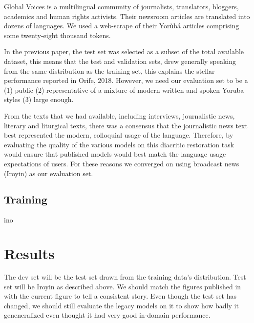 \documentclass{article} %
\begin{document}
Global Voices is a multilingual community of journalists, translators, bloggers, academics and human rights activists. Their newsroom articles are translated into dozens of languages. We used a web-scrape of their Yor{\`u}b{\'a} articles comprising some twenty-eight thousand tokens.

In the previous paper, the test set was selected as a subset of the total available dataset, this means that the test and validation sets, drew generally speaking from the same distribution as the training set, this explains the stellar performance reported in Orife, 2018. However, we need our evaluation set to be a (1) public (2) representative of a mixture of modern written and spoken Yoruba styles (3) large enough. 

From the texts that we had available, including interviews, journalistic news, literary and liturgical texts, there was a consensus that the journalistic news text best represented the modern, colloquial usage of the language. Therefore, by evaluating the quality of the various models on this diacritic restoration task would ensure that published models would best match the language usage expectations of users. For these reasons we converged on using broadcast news (Iroyin) as our evaluation set.


\subsection{Training}\label{sec:training}
ino

\section{Results}\label{sec:results}


The dev set will be the test set drawn from the training data's distribution. Test set will be Iroyin as described above. We should match the figures published in \citep{orife2018adr} with the current figure to tell a consistent story. Even though the test set has changed, we should still evaluate the legacy models on it to show how badly it geneneralized even thought it had very good in-domain performance.
\end{document}

